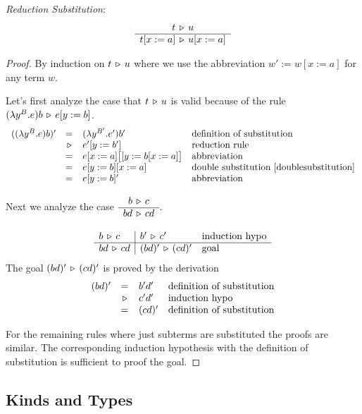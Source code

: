 \begin{lemma}
  \label{reductionsubstitution}
  \emph{Reduction Substitution}:
  $$
  \begin{array}{c} t \,\triangleright\, u
   \\ \hline t[x:=a] \,\triangleright\, u[x:=a]\end{array}
  $$
  \begin{proof} By induction on $t \,\triangleright\, u$ where we use the abbreviation
    $w' := w[x:=a]$ for any term $w$.

    Let's first analyze the case that $t \,\triangleright\, u$ is valid because of the
    rule $(\lambda y^B.e) b \,\triangleright\, e[y:=b]$.
    $$
    \begin{array}{llll}
      ((\lambda y^B.e) b)'
      &=& (\lambda y^{B'}. e') b'
      &\text{definition of substitution}
      \\
      &\,\triangleright\, & e'[y:=b'] &\text{reduction rule}
      \\
      &=& e[x:=a]\big[[y:=b[x:=a]\big]   &\text{abbreviation}
      \\
      &=& e[y:=b][x:=a]
      &\text{double substitution~\ref{doublesubstitution}}
      \\
      &=& e[y:=b]'  &\text{abbreviation}
    \end{array}
    $$

    Next we analyze the case $\begin{array}{c} b \,\triangleright\, c \\ \hline bd \,\triangleright\, cd\end{array}$.

    $$
    \begin{array}{l|ll}
      b \,\triangleright\, c    & b' \,\triangleright\, c' & \text{induction hypo}
      \\ \hline
      bd \,\triangleright\, cd  & (bd)' \,\triangleright\, (cd)' & \text{goal}
    \end{array}
    $$
    The goal $(bd)' \,\triangleright\, (cd)'$ is proved by the derivation
    $$
    \begin{array}{llll}
      (bd)'
      &=& b' d'        &\text{definition of substitution}
      \\
      &\,\triangleright\,& c' d'  &\text{induction hypo}
      \\
      &=& (cd)'        &\text{definition of substitution}
    \end{array}
    $$

    For the remaining rules where just subterms are substituted the proofs are
    similar. The corresponding induction hypothesis with the definition of
    substitution is sufficient to proof the goal.
  \end{proof}
\end{lemma}


\subsection{Kinds and Types}

